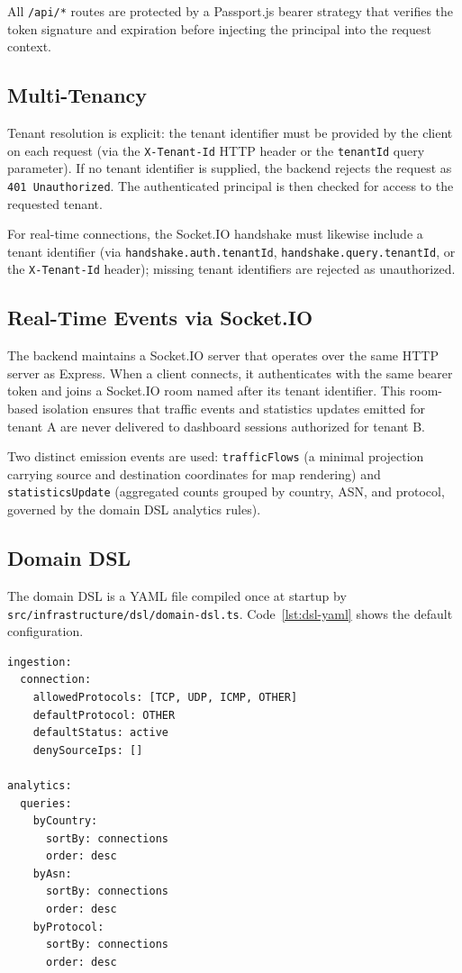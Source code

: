 \documentclass[12pt]{report}
\begin{document}
All \texttt{/api/*} routes are protected by a Passport.js bearer strategy that
verifies the token signature and expiration before injecting the principal into
the request context.

\subsection{Multi-Tenancy}

Tenant resolution is explicit: the tenant identifier must be provided by the
client on each request (via the \texttt{X-Tenant-Id} HTTP header or the
\texttt{tenantId} query parameter). If no tenant identifier is supplied, the
backend rejects the request as \texttt{401 Unauthorized}. The authenticated
principal is then checked for access to the requested tenant.

For real-time connections, the Socket.IO handshake must likewise include a
tenant identifier (via \texttt{handshake.auth.tenantId}, \texttt{handshake.query.tenantId},
or the \texttt{X-Tenant-Id} header); missing tenant identifiers are rejected
as unauthorized.

\subsection{Real-Time Events via Socket.IO}

The backend maintains a Socket.IO server that operates over the same HTTP
server as Express. When a client connects, it authenticates with the same
bearer token and joins a Socket.IO room named after its tenant identifier.
This room-based isolation ensures that traffic events and statistics updates
emitted for tenant A are never delivered to dashboard sessions authorized for
tenant B.

Two distinct emission events are used: \texttt{trafficFlows} (a minimal
projection carrying source and destination coordinates for map rendering) and
\texttt{statisticsUpdate} (aggregated counts grouped by country, ASN, and
protocol, governed by the domain DSL analytics rules).

\subsection{Domain DSL}

The domain DSL is a YAML file compiled once at startup by
\texttt{src/infrastructure/dsl/domain-dsl.ts}. Code~\ref{lst:dsl-yaml} shows
the default configuration.

\begin{lstlisting}[language=bash, caption={Default domain DSL configuration (\texttt{config/domain.dsl.yaml}).}, label={lst:dsl-yaml}]
ingestion:
  connection:
    allowedProtocols: [TCP, UDP, ICMP, OTHER]
    defaultProtocol: OTHER
    defaultStatus: active
    denySourceIps: []

analytics:
  queries:
    byCountry:
      sortBy: connections
      order: desc
    byAsn:
      sortBy: connections
      order: desc
    byProtocol:
      sortBy: connections
      order: desc
\end{lstlisting}
\end{document}
